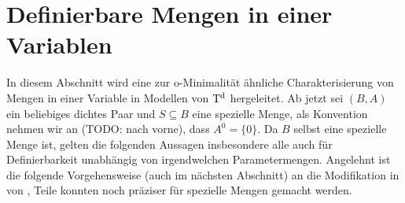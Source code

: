 \section{Definierbare Mengen in einer Variablen}
In diesem Abschnitt wird eine zur o-Minimalität ähnliche Charakterisierung von Mengen in einer Variable in Modellen von $\operatorname{T^d}$ hergeleitet. Ab jetzt sei $(B,A)$ ein beliebiges dichtes Paar und $S\subseteq B$ eine spezielle Menge, als Konvention nehmen wir an (TODO: nach vorne), dass $A^0=\{0\}$. Da $B$ selbst eine spezielle Menge ist, gelten die folgenden Aussagen insbesondere alle auch für Definierbarkeit unabhängig von irgendwelchen Parametermengen. Angelehnt ist die folgende Vorgehensweise (auch im nächsten Abschnitt) an die Modifikation in \cite{Piz} von \cite{VanDenDries}, Teile konnten noch präziser für spezielle Mengen gemacht werden.

